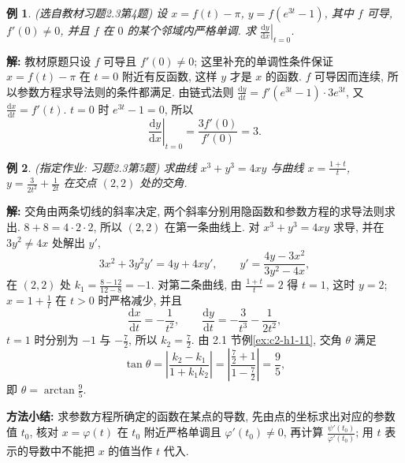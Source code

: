 \documentclass[UTF8,openany]{ctexbook}
\theoremstyle{chinesetextbook}
\newtheorem{example}{例}[section]
\newenvironment{cnsolution}{\par\indent\textbf{解:} \ignorespaces}{\par}
\newcommand{\dd}{\mathrm d}
\begin{document}
\begin{example}\label{ex:c2-h3-4}
\textnormal{(选自教材习题2.3第4题)} 设 $x=f(t)-\pi$, $y=f\left(e^{3t}-1\right)$, 其中 $f$ 可导, $f'(0)\ne0$, 并且 $f$ 在 $0$ 的某个邻域内严格单调. 求 $\displaystyle\left.\frac{\dd y}{\dd x}\right|_{t=0}$.
\end{example}
\begin{cnsolution}
教材原题只设 $f$ 可导且 $f'(0)\ne0$; 这里补充的单调性条件保证 $x=f(t)-\pi$ 在 $t=0$ 附近有反函数, 这样 $y$ 才是 $x$ 的函数. $f$ 可导因而连续, 所以参数方程求导法则的条件都满足. 由链式法则 $\displaystyle\frac{\dd y}{\dd t}=f'\left(e^{3t}-1\right)\cdot3e^{3t}$, 又 $\displaystyle\frac{\dd x}{\dd t}=f'(t)$. $t=0$ 时 $e^{3t}-1=0$, 所以
\[
\left.\frac{\dd y}{\dd x}\right|_{t=0}=\frac{3f'(0)}{f'(0)}=3.
\]
\end{cnsolution}
\begin{example}\label{ex:c2-h3-5}
\textnormal{(指定作业: 习题2.3第5题)} 求曲线 $x^3+y^3=4xy$ 与曲线 $\displaystyle x=\frac{1+t}t$, $\displaystyle y=\frac3{2t^2}+\frac1{2t}$ 在交点 $(2,2)$ 处的交角.
\end{example}
\begin{cnsolution}
交角由两条切线的斜率决定, 两个斜率分别用隐函数和参数方程的求导法则求出. $8+8=4\cdot2\cdot2$, 所以 $(2,2)$ 在第一条曲线上. 对 $x^3+y^3=4xy$ 求导, 并在 $3y^2\ne4x$ 处解出 $y'$,
\[
3x^2+3y^2y'=4y+4xy',\qquad y'=\frac{4y-3x^2}{3y^2-4x},
\]
在 $(2,2)$ 处 $\displaystyle k_1=\frac{8-12}{12-8}=-1$. 对第二条曲线, 由 $\displaystyle\frac{1+t}t=2$ 得 $t=1$, 这时 $y=2$; $\displaystyle x=1+\frac1t$ 在 $t>0$ 时严格减少, 并且
\[
\frac{\dd x}{\dd t}=-\frac1{t^2},\qquad\frac{\dd y}{\dd t}=-\frac3{t^3}-\frac1{2t^2},
\]
$t=1$ 时分别为 $-1$ 与 $\displaystyle-\frac72$, 所以 $\displaystyle k_2=\frac72$. 由 2.1 节例\ref{ex:c2-h1-11}, 交角 $\theta$ 满足
\[
\tan\theta=\left|\frac{k_2-k_1}{1+k_1k_2}\right|=\left|\frac{\frac72+1}{1-\frac72}\right|=\frac95,
\]
即 $\displaystyle\theta=\arctan\frac95$.
\end{cnsolution}
\par\indent\textbf{方法小结:} 求参数方程所确定的函数在某点的导数, 先由点的坐标求出对应的参数值 $t_0$, 核对 $x=\varphi(t)$ 在 $t_0$ 附近严格单调且 $\varphi'(t_0)\ne0$, 再计算 $\displaystyle\frac{\psi'(t_0)}{\varphi'(t_0)}$; 用 $t$ 表示的导数中不能把 $x$ 的值当作 $t$ 代入.
\end{document}
